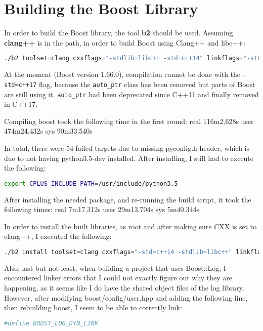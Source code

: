 \section{Building the Boost Library}

In order to build the Boost library, the tool \textbf{b2} should be used. Assuming \textbf{clang++} is in the path, in order to build Boost using Clang++ and libc++:

\begin{lstlisting}[language=bash]
    ./b2 toolset=clang cxxflags="-stdlib=libc++ -std=c++14" linkflags="-stdlib=libc++" -j 8
\end{lstlisting}

At the moment (Boost version 1.66.0), compilation cannot be done with the \lstinline[language=bash]|-std=c++17| flag, because the \lstinline|auto_ptr| class has been removed but parts of Boost are still using it. \lstinline|auto_ptr| had been deprecated since C++11 and finally removed in C++17.

Compiling boost took the following time in the first round:
real	116m2.628s
user	474m24.432s
sys	90m33.540s

In total, there were 54 failed targets due to missing pyconfig.h header, which is due to not having python3.5-dev installed. After installing, I still had to execute the following:
\begin{lstlisting}[language=bash]
    export CPLUS_INCLUDE_PATH=/usr/include/python3.5
\end{lstlisting}

After installing the needed package, and re-running the build script, it took the following times:
real	7m17.312s
user	29m13.704s
sys	5m40.344s

In order to install the built libraries, as root and after making sure CXX is set to clang++, I executed the following:
\begin{lstlisting}[language=bash]
    ./b2 install toolset=clang cxxflags="-std=c++14 -stdlib=libc++" linkflags="-stdlib=libc++" --prefix=/usr/local
\end{lstlisting}

Also, last but not least, when building a project that uses Boost::Log, I encountered linker errors that I could not exactly figure out why they are happening, as it seems like I do have the shared object files of the log library. However, after modifying boost/config/user.hpp and adding the following line, then rebuilding boost, I seem to be able to correctly link:
\begin{lstlisting}[language=bash]
    #define BOOST_LOG_DYN_LINK
\end{lstlisting}

